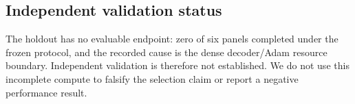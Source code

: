 \subsection{Independent validation status}

The holdout has no evaluable endpoint: zero of six panels completed under the
frozen protocol, and the recorded cause is the dense decoder/Adam resource
boundary. Independent validation is therefore not established. We do not use
this incomplete compute to falsify the selection claim or report a negative
performance result.
